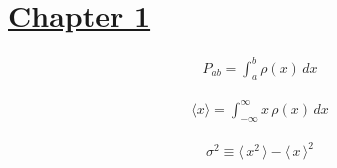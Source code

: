 \clearpage
\vspace*{-5.5\baselineskip}
{}
\vspace*{1.5\baselineskip}
\label{sec:EquationList}


\section*{\underline{Chapter 1}}
\begin{align*}
  P_{ab} = \int_{a}^{b} \rho(x) \, dx
\end{align*}

\begin{align*}
  \langle x \rangle = \int_{- \infty}^{\infty} x \, \rho(x) \, dx
\end{align*}

\begin{align*}
  \sigma^{2} \equiv \langle \, x^{2} \, \rangle - \langle \, x \, \rangle^{2}
\end{align*}

\newpage
